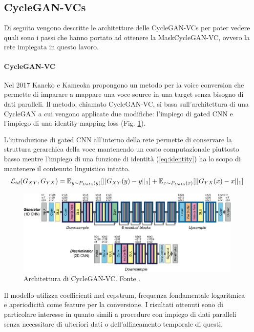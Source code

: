 		\subsection{CycleGAN-VCs}
			Di seguito vengono descritte le architetture delle CycleGAN-VCs per poter vedere quali sono i passi che hanno portato ad ottenere la MaskCycleGAN-VC, ovvero la rete impiegata in questo lavoro.
			
			\paragraph{CycleGAN-VC}
			Nel 2017 Kaneko e Kameoka propongono un metodo per la voice conversion che permette di imparare a mappare una voce source in una target senza bisogno di dati paralleli. Il metodo, chiamato CycleGAN-VC, si basa sull'architettura di una CycleGAN a cui vengono applicate due modifiche: l'impiego di gated CNN e l'impiego di una identity-mapping loss (Fig. \ref{fig:cyclegan-vc})\cite{CycleGAN-VC}.
			
			L'introduzione di gated CNN all'interno della rete permette di conservare la struttura gerarchica della voce mantenendo un costo computazionale piuttosto basso mentre l'impiego di una funzione di identità (\ref{eq:identity}) ha lo scopo di mantenere il contenuto linguistico intatto.
			\begin{equation}
				\mathcal{L}_{id}(G_{XY}, G_{YX}) = \mathbb{E}_{y \sim P_{Data}(y)}[||G_{XY}(y) - y||_1] \\
				+ \mathbb{E}_{x \sim P_{Data}(x)}[||G_{YX}(x) - x||_1]
			\label{eq:identity}
			\end{equation}
			
			\begin{figure}[h]
				\centering
				\includegraphics[width=1\linewidth]{figures/CycleGAN-VC}
				\caption{Architettura di CycleGAN-VC. Fonte \cite{CycleGAN-VC}.}
				\label{fig:cyclegan-vc}
			\end{figure}
		
			Il modello utilizza coefficienti mel cepstrum, frequenza fondamentale logaritmica e aperiodicità come feature per la conversione.
			I risultati ottenuti sono di particolare interesse in quanto simili a procedure con impiego di dati paralleli senza necessitare di ulteriori dati o dell'allineamento temporale di questi.
		
